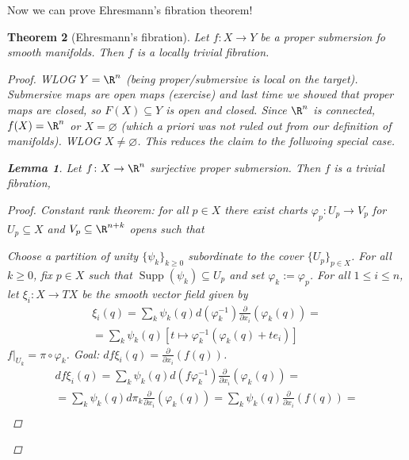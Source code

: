 \documentclass[A4paper, british]{amsart}
\theoremstyle{darkgreentheorem}
\newtheorem{thm}{Theorem}[section]
\newtheorem{lm}[thm]{Lemma}
\theoremstyle{darkbluedefinition}
\theoremstyle{darkredexample}
\theoremstyle{remark}
\DeclareMathOperator{\Supp}{Supp}
\newcommand{\1}{\mathbbm{1}}
\newcommand{\sub}{\subseteq}
\begin{document}
Now we can prove Ehresmann's fibration theorem!

\begin{thm}[Ehresmann's fibration]
    Let $f\colon X\to Y$ be a proper submersion fo smooth manifolds.
    Then $f$ is a locally trivial fibration.
    \begin{proof}
	WLOG $Y=\R^{n}$ (being proper/submersive is local on the target).
	Submersive maps are open maps (exercise) and last time we showed that proper maps are closed, so $F(X)\sub Y$ is open and closed.
	Since $\R^{n}$ is connected, $f(X)=\R^{n}$ or $X=\varnothing$ (which a priori was not ruled out from our definition of manifolds).
	WLOG $X\neq\varnothing$.
	This reduces the claim to the follwoing special case.
	\begin{lm}
	    Let $f\colon X\to \R^{n}$ surjective proper submersion.
	    Then $f$ is a trivial fibration,
	    \begin{proof}
		Constant rank theorem: for all $p\in X$ there exist charts $\varphi_{p}\colon U_{p}\to V_{p}$ for $U_{p}\sub X$ and $V_{p}\sub \R^{n+k}$ opens such that
		\begin{center}
		\end{center}
		Choose a partition of unity $\{\psi_{k}\}_{k\geqslant 0}$ subordinate to the cover $\{U_{p}\}_{p\in X}$.
		For all $k\geqslant 0$, fix $p\in X$ such that $\Supp(\psi_{k})\sub U_{p}$ and set $\varphi_{k}:=\varphi_{p}$.
		For all $1\leqslant i\leqslant n$, let $\xi_{i}\colon X\to TX$ be the smooth vector field given by
		\begin{multline*}
		    \xi_{i}(q)=\sum_{k}\psi_{k}(q)d(\varphi_{k}^{-1})\frac{\partial}{\partial x_{i}}(\varphi_{k}(q)) =\\
		    = \sum_{k}\psi_{k}(q)[t\mapsto \varphi^{-1}_{k}(\varphi_{k}(q)+te_{i}) ]
		\end{multline*}
		$f|_{U_{k}}=\pi\circ \varphi_{k}$.
		Goal: $df\xi_{i}(q)=\frac{\partial }{\partial x_{i}}(f(q))$.
		\begin{multline*}
		    df\xi_{i}(q)=\sum_{k}\psi_{k}(q)d(f\varphi_{k}^{-1})\frac{\partial }{\partial x_{i}}(\varphi_{k}(q)) =\\
		    =\sum_{k} \psi_{k}(q)d\pi_{k}\frac{\partial }{\partial x_{i}}(\varphi_{k}(q))=\sum_{k}\psi_{k}(q)\frac{\partial}{\partial x_{i}}(f(q)) =\\

\end{multline*}
\end{proof}
\end{lm}
\end{proof}
\end{thm}
\end{document}
